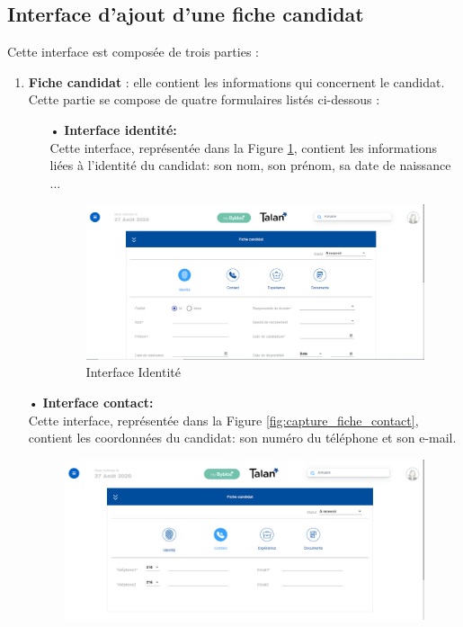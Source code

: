 \subsection{Interface d'ajout d'une fiche candidat}
Cette interface est composée de trois parties :
\begin{enumerate}[label=\textbf{\arabic*. }]
    \item \textbf{Fiche candidat} : elle contient les informations qui concernent le candidat. Cette partie se compose de quatre formulaires listés ci-dessous :
    \begin{enumerate}
        \item [•] \textbf{Interface identité:} \\Cette interface, représentée dans la Figure \ref{fig:capture_fiche_identité}, contient les informations liées à l'identité du candidat: son nom, son prénom, sa date de naissance $\dots$ 
         \begin{figure}[H]
     \centering
     \includegraphics[scale=0.5]{img/capture fiche candidat identite.PNG}
     \caption{Interface Identité}
     \label{fig:capture_fiche_identité}
 \end{figure}
    \end{enumerate}
    \item [•] \textbf{Interface contact:}\\Cette interface, représentée dans la Figure \ref{fig:capture_fiche_contact}, contient les coordonnées du candidat: son numéro du téléphone et son e-mail.
    \begin{figure}[H]
     \centering
     \includegraphics[scale=0.5]{img/capture fiche candidat contact.PNG}

\end{figure}
\end{enumerate}
